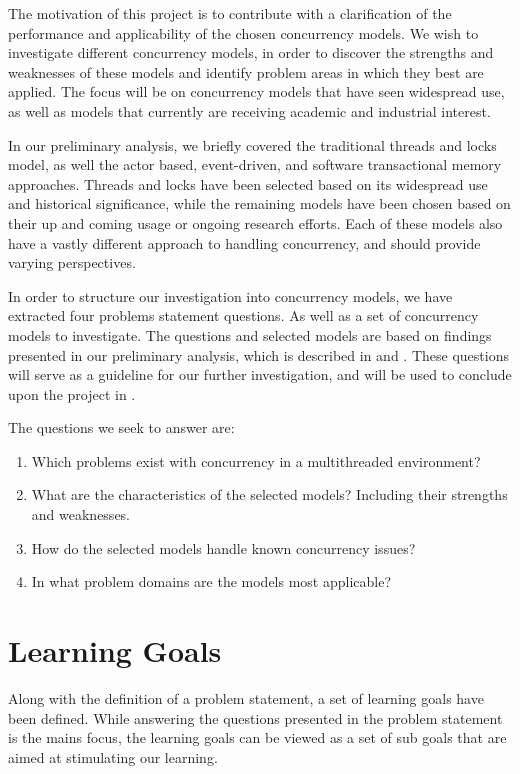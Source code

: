 \makeatletter {}\makeatother
{}
%
The motivation of this project is to contribute with a clarification of the performance and applicability of the chosen concurrency models. We wish to investigate different concurrency models, in order to discover the strengths and weaknesses of these models and identify problem areas in which they best are applied. The focus will be on concurrency models that have seen widespread use, as well as models that currently are receiving academic and industrial interest.

In our preliminary analysis, we briefly covered the traditional threads and locks model, as well the actor based, event-driven, and software transactional memory approaches. Threads and locks have been selected based on its widespread use and historical significance, while the remaining models have been chosen based on their up and coming usage or ongoing research efforts. Each of these models also have a vastly different approach to handling concurrency, and should provide varying perspectives.

In order to structure our investigation into concurrency models, we have extracted four problems statement questions. As well as a set of concurrency models to investigate. The questions and selected models are based on findings presented in our preliminary analysis, which is described in  and . These questions will serve as a guideline for our further investigation, and will be used to conclude upon the project in .

The questions we seek to answer are:
\begin{enumerate}
\item Which problems exist with concurrency in a multithreaded environment? 
\item What are the characteristics of the selected models? Including their strengths and weaknesses.
\item How do the selected models handle known concurrency issues?
\item In what problem domains are the models most applicable?
\end{enumerate}

\section{Learning Goals}
Along with the definition of a problem statement, a set of learning goals have been defined. While answering the questions presented in the problem statement is the mains focus, the learning goals can be viewed as a set of sub goals that are aimed at stimulating our learning.

